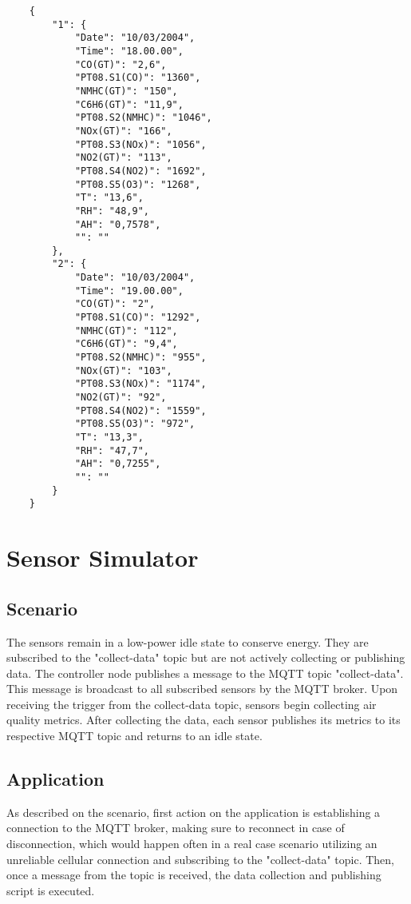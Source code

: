 \begin{verbatim}
    {
        "1": {
            "Date": "10/03/2004",
            "Time": "18.00.00",
            "CO(GT)": "2,6",
            "PT08.S1(CO)": "1360",
            "NMHC(GT)": "150",
            "C6H6(GT)": "11,9",
            "PT08.S2(NMHC)": "1046",
            "NOx(GT)": "166",
            "PT08.S3(NOx)": "1056",
            "NO2(GT)": "113",
            "PT08.S4(NO2)": "1692",
            "PT08.S5(O3)": "1268",
            "T": "13,6",
            "RH": "48,9",
            "AH": "0,7578",
            "": ""
        },
        "2": {
            "Date": "10/03/2004",
            "Time": "19.00.00",
            "CO(GT)": "2",
            "PT08.S1(CO)": "1292",
            "NMHC(GT)": "112",
            "C6H6(GT)": "9,4",
            "PT08.S2(NMHC)": "955",
            "NOx(GT)": "103",
            "PT08.S3(NOx)": "1174",
            "NO2(GT)": "92",
            "PT08.S4(NO2)": "1559",
            "PT08.S5(O3)": "972",
            "T": "13,3",
            "RH": "47,7",
            "AH": "0,7255",
            "": ""
        }
    }
\end{verbatim}

\section{Sensor Simulator}
\subsection{Scenario}
The sensors remain in a low-power idle state to conserve energy. They are subscribed to the "collect-data" topic but are not actively collecting or publishing data. The controller node publishes a message to the MQTT topic "collect-data". This message is broadcast to all subscribed sensors by the MQTT broker. Upon receiving the trigger from the collect-data topic, sensors begin collecting air quality metrics. After collecting the data, each sensor publishes its metrics to its respective MQTT topic and returns to an idle state.
\subsection{Application}
As described on the scenario, first action on the application is establishing a connection to the MQTT broker, making sure to reconnect in case of disconnection, which would happen often in a real case scenario utilizing an unreliable cellular connection and subscribing to the "collect-data" topic. Then, once a message from the topic is received, the data collection and publishing script is executed.

